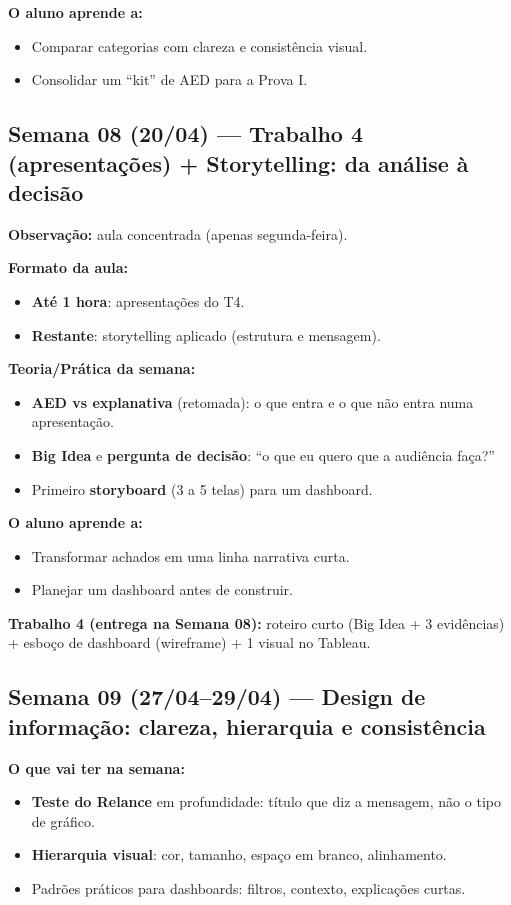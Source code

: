\textbf{O aluno aprende a:}
\begin{itemize}[leftmargin=*]
  \item Comparar categorias com clareza e consistência visual.
  \item Consolidar um ``kit'' de AED para a Prova I.
\end{itemize}

\subsection*{Semana 08 (20/04) --- Trabalho 4 (apresentações) + Storytelling: da análise à decisão}
\textbf{Observação:} aula concentrada (apenas segunda-feira).

\textbf{Formato da aula:}
\begin{itemize}[leftmargin=*]
  \item \textbf{Até 1 hora}: apresentações do T4.
  \item \textbf{Restante}: storytelling aplicado (estrutura e mensagem).
\end{itemize}

\textbf{Teoria/Prática da semana:}
\begin{itemize}[leftmargin=*]
  \item \textbf{AED vs explanativa} (retomada): o que entra e o que não entra numa apresentação.
  \item \textbf{Big Idea} e \textbf{pergunta de decisão}: ``o que eu quero que a audiência faça?''
  \item Primeiro \textbf{storyboard} (3 a 5 telas) para um dashboard.
\end{itemize}

\textbf{O aluno aprende a:}
\begin{itemize}[leftmargin=*]
  \item Transformar achados em uma linha narrativa curta.
  \item Planejar um dashboard antes de construir.
\end{itemize}

\begin{SolvedBox}
\textbf{Trabalho 4 (entrega na Semana 08):} roteiro curto (Big Idea + 3 evidências) + esboço de dashboard (wireframe) + 1 visual no Tableau.
\end{SolvedBox}

\subsection*{Semana 09 (27/04--29/04) --- Design de informação: clareza, hierarquia e consistência}
\textbf{O que vai ter na semana:}
\begin{itemize}[leftmargin=*]
  \item \textbf{Teste do Relance} em profundidade: título que diz a mensagem, não o tipo de gráfico.
  \item \textbf{Hierarquia visual}: cor, tamanho, espaço em branco, alinhamento.
  \item Padrões práticos para dashboards: filtros, contexto, explicações curtas.
\end{itemize}

